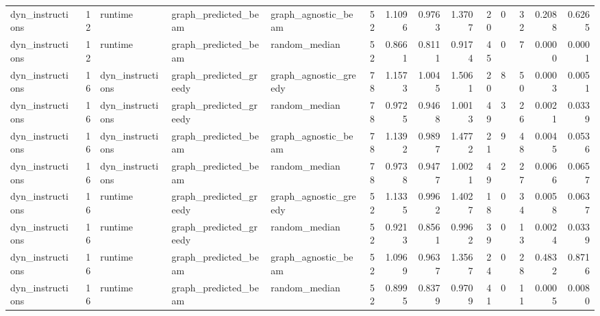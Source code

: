 \begin{table}[t]
\begin{tabular}{lrlllrrrrrrrrr}
dyn\_instructions & 12 & runtime & graph\_predicted\_beam & graph\_agnostic\_beam & 52 & 1.1096 & 0.9763 & 1.3707 & 20 & 0 & 32 & 0.2088 & 0.6265 \\
dyn\_instructions & 12 & runtime & graph\_predicted\_beam & random\_median & 52 & 0.8661 & 0.8111 & 0.9174 & 45 & 0 & 7 & 0.0000 & 0.0001 \\
dyn\_instructions & 16 & dyn\_instructions & graph\_predicted\_greedy & graph\_agnostic\_greedy & 78 & 1.1573 & 1.0045 & 1.5061 & 20 & 8 & 50 & 0.0003 & 0.0051 \\
dyn\_instructions & 16 & dyn\_instructions & graph\_predicted\_greedy & random\_median & 78 & 0.9725 & 0.9468 & 1.0013 & 49 & 3 & 26 & 0.0021 & 0.0339 \\
dyn\_instructions & 16 & dyn\_instructions & graph\_predicted\_beam & graph\_agnostic\_beam & 78 & 1.1392 & 0.9897 & 1.4772 & 21 & 9 & 48 & 0.0045 & 0.0536 \\
dyn\_instructions & 16 & dyn\_instructions & graph\_predicted\_beam & random\_median & 78 & 0.9738 & 0.9477 & 1.0021 & 49 & 2 & 27 & 0.0066 & 0.0657 \\
dyn\_instructions & 16 & runtime & graph\_predicted\_greedy & graph\_agnostic\_greedy & 52 & 1.1335 & 0.9962 & 1.4027 & 18 & 0 & 34 & 0.0058 & 0.0637 \\
dyn\_instructions & 16 & runtime & graph\_predicted\_greedy & random\_median & 52 & 0.9213 & 0.8561 & 0.9962 & 39 & 0 & 13 & 0.0024 & 0.0339 \\
dyn\_instructions & 16 & runtime & graph\_predicted\_beam & graph\_agnostic\_beam & 52 & 1.0969 & 0.9637 & 1.3567 & 24 & 0 & 28 & 0.4832 & 0.8716 \\
dyn\_instructions & 16 & runtime & graph\_predicted\_beam & random\_median & 52 & 0.8995 & 0.8379 & 0.9709 & 41 & 0 & 11 & 0.0005 & 0.0080 \\
\bottomrule
\end{tabular}
\end{table}
